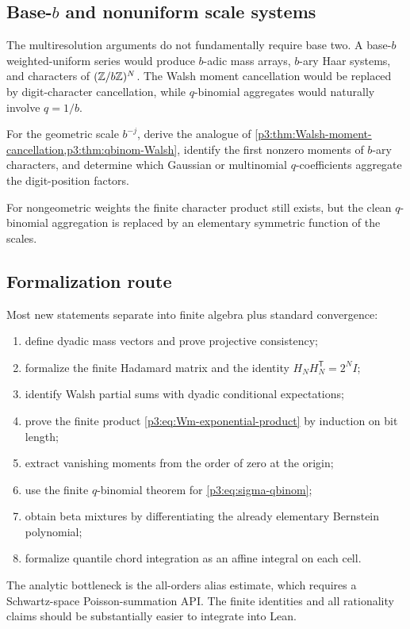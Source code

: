 \documentclass[11pt]{article}
\theoremstyle{definition}
\theoremstyle{remark}
\begin{document}
\subsection{Base-$b$ and nonuniform scale systems}

The multiresolution arguments do not fundamentally require base two.  A
base-$b$ weighted-uniform series would produce $b$-adic mass arrays,
$b$-ary Haar systems, and characters of $(\mathbb Z/b\mathbb Z)^N$.  The Walsh moment
cancellation would be replaced by digit-character cancellation, while
$q$-binomial aggregates would naturally involve $q=1/b$.

\begin{openproblem}
\label{p3:op:base-b}
For the geometric scale $b^{-j}$, derive the analogue of
\cref{p3:thm:Walsh-moment-cancellation,p3:thm:qbinom-Walsh}, identify the first
nonzero moments of $b$-ary characters, and determine which Gaussian or
multinomial $q$-coefficients aggregate the digit-position factors.
\end{openproblem}

For nongeometric weights the finite character product still exists, but the
clean $q$-binomial aggregation is replaced by an elementary symmetric function
of the scales.

\subsection{Formalization route}

Most new statements separate into finite algebra plus standard convergence:
\begin{enumerate}
\item define dyadic mass vectors and prove projective consistency;
\item formalize the finite Hadamard matrix and the identity
      $H_NH_N^{\mathsf T}=2^NI$;
\item identify Walsh partial sums with dyadic conditional expectations;
\item prove the finite product \eqref{p3:eq:Wm-exponential-product} by induction on
      bit length;
\item extract vanishing moments from the order of zero at the origin;
\item use the finite $q$-binomial theorem for
      \eqref{p3:eq:sigma-qbinom};
\item obtain beta mixtures by differentiating the already elementary
      Bernstein polynomial;
\item formalize quantile chord integration as an affine integral on each cell.
\end{enumerate}
The analytic bottleneck is the all-orders alias estimate, which requires a
Schwartz-space Poisson-summation API.  The finite identities and all rationality
claims should be substantially easier to integrate into Lean.
\end{document}

